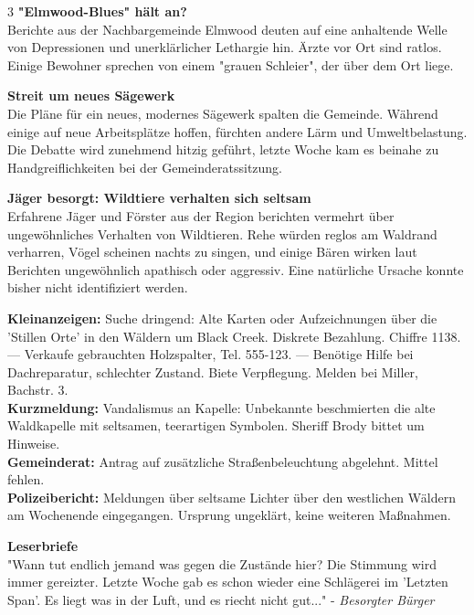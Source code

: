 \documentclass[10pt, a4paper]{article}
\newcommand{\articlesep}{\vspace{0.8em}}
\begin{document}
\begin{multicols}{3}
\articlesep %
\large \textbf{"Elmwood-Blues" hält an?} \normalsize \\
Berichte aus der Nachbargemeinde Elmwood deuten auf eine anhaltende Welle von Depressionen und unerklärlicher Lethargie hin. Ärzte vor Ort sind ratlos. Einige Bewohner sprechen von einem "grauen Schleier", der über dem Ort liege.

\articlesep %
\large \textbf{Streit um neues Sägewerk} \normalsize \\
Die Pläne für ein neues, modernes Sägewerk spalten die Gemeinde. Während einige auf neue Arbeitsplätze hoffen, fürchten andere Lärm und Umweltbelastung. Die Debatte wird zunehmend hitzig geführt, letzte Woche kam es beinahe zu Handgreiflichkeiten bei der Gemeinderatssitzung.

\articlesep %
\large \textbf{Jäger besorgt: Wildtiere verhalten sich seltsam} \normalsize \\
Erfahrene Jäger und Förster aus der Region berichten vermehrt über ungewöhnliches Verhalten von Wildtieren. Rehe würden reglos am Waldrand verharren, Vögel scheinen nachts zu singen, und einige Bären wirken laut Berichten ungewöhnlich apathisch oder aggressiv. Eine natürliche Ursache konnte bisher nicht identifiziert werden.

\hrulefill %

\small
\textbf{Kleinanzeigen:} Suche dringend: Alte Karten oder Aufzeichnungen über die 'Stillen Orte' in den Wäldern um Black Creek. Diskrete Bezahlung. Chiffre 1138. --- Verkaufe gebrauchten Holzspalter, Tel. 555-123. --- Benötige Hilfe bei Dachreparatur, schlechter Zustand. Biete Verpflegung. Melden bei Miller, Bachstr. 3. \\
\textbf{Kurzmeldung:} Vandalismus an Kapelle: Unbekannte beschmierten die alte Waldkapelle mit seltsamen, teerartigen Symbolen. Sheriff Brody bittet um Hinweise. \\
\textbf{Gemeinderat:} Antrag auf zusätzliche Straßenbeleuchtung abgelehnt. Mittel fehlen. \\
\textbf{Polizeibericht:} Meldungen über seltsame Lichter über den westlichen Wäldern am Wochenende eingegangen. Ursprung ungeklärt, keine weiteren Maßnahmen. \\
\normalsize
\hrulefill %

\large \textbf{Leserbriefe} \normalsize \\
"Wann tut endlich jemand was gegen die Zustände hier? Die Stimmung wird immer gereizter. Letzte Woche gab es schon wieder eine Schlägerei im 'Letzten Span'. Es liegt was in der Luft, und es riecht nicht gut..." - \textit{Besorgter Bürger} \\


\end{multicols}
\end{document}
